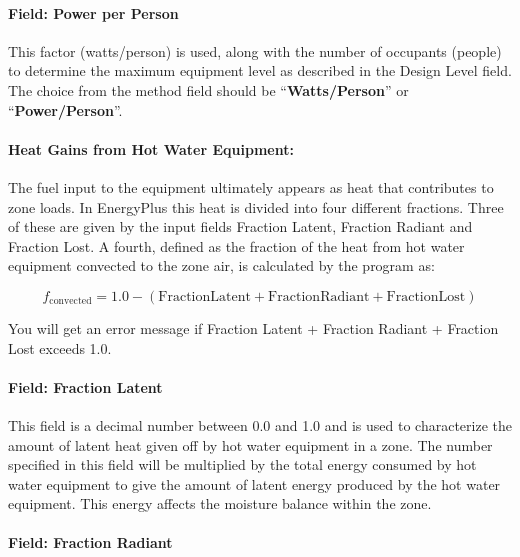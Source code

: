 \paragraph{Field: Power per Person}\label{field-power-per-person-1}

This factor (watts/person) is used, along with the number of occupants (people) to determine the maximum equipment level as described in the Design Level field. The choice from the method field should be ``\textbf{Watts/Person}'' or ``\textbf{Power/Person}''.

\paragraph{Heat Gains from Hot Water Equipment:}\label{heat-gains-from-hot-water-equipment}

The fuel input to the equipment ultimately appears as heat that contributes to zone loads. In EnergyPlus this heat is divided into four different fractions. Three of these are given by the input fields Fraction Latent, Fraction Radiant and Fraction Lost. A fourth, defined as the fraction of the heat from hot water equipment convected to the zone air, is calculated by the program as:

\begin{equation}
  f_{\mathrm{convected}} = 1.0 - (\mathrm{Fraction Latent} + \mathrm{Fraction Radiant} + \mathrm{Fraction Lost})
\end{equation}

You will get an error message if Fraction Latent + Fraction Radiant + Fraction Lost exceeds 1.0.

\paragraph{Field: Fraction Latent}\label{field-fraction-latent-2}

This field is a decimal number between 0.0 and 1.0 and is used to characterize the amount of latent heat given off by hot water equipment in a zone. The number specified in this field will be multiplied by the total energy consumed by hot water equipment to give the amount of latent energy produced by the hot water equipment. This energy affects the moisture balance within the zone.

\paragraph{Field: Fraction Radiant}\label{field-fraction-radiant-4}

